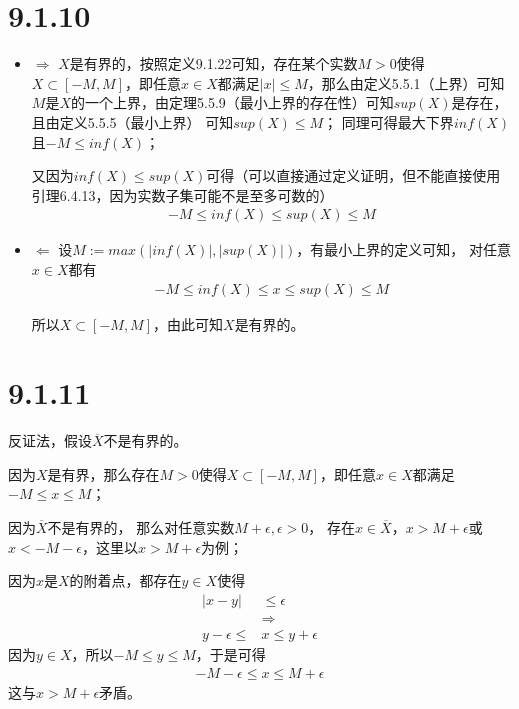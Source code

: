 \documentclass{article}
\begin{document}
\section*{9.1.10}

\begin{itemize}
      \item $\Rightarrow$ $X$是有界的，按照定义9.1.22可知，存在某个实数$M > 0$使得
            $X \subset [-M, M]$，即任意$x \in X$都满足$|x| \leq M$，那么由定义5.5.1（上界）可知
            $M$是$X$的一个上界，由定理5.5.9（最小上界的存在性）可知$sup(X)$是存在，且由定义5.5.5（最小上界）
            可知$sup(X) \leq M$；
            同理可得最大下界$inf(X)$且$-M \leq inf(X)$；

            又因为$inf(X) \leq sup(X)$可得（可以直接通过定义证明，但不能直接使用引理6.4.13，因为实数子集可能不是至多可数的）
            \begin{align*}
                  -M \leq inf(X) \leq sup(X) \leq M
            \end{align*}

      \item $\Leftarrow$ 设$M := max(|inf(X)|, |sup(X)|)$，有最小上界的定义可知，
            对任意$x \in X$都有
            \begin{align*}
                  -M \leq  inf(X) \leq x \leq sup(X) \leq M
            \end{align*}

            所以$X \subset [-M, M]$，由此可知$X$是有界的。
\end{itemize}

\section*{9.1.11}

反证法，假设$\overline{X}$不是有界的。

因为$X$是有界，那么存在$M > 0$使得$X \subset [-M, M]$，即任意$x \in X$都满足$-M \leq x \leq M$；

因为$\overline{X}$不是有界的，
那么对任意实数$M + \epsilon, \epsilon > 0$，
存在$x \in \overline{X}$，$x > M + \epsilon$或$x < -M - \epsilon$，这里以$x > M + \epsilon$为例；

因为$x$是$X$的附着点，都存在$y \in X$使得
\begin{align*}
      |x - y|           & \leq \epsilon       \\
                        & \Rightarrow         \\
      y - \epsilon \leq & x \leq y + \epsilon
\end{align*}
因为$y \in X$，所以$-M \leq y \leq M$，于是可得
\begin{align*}
      -M - \epsilon \leq x \leq M + \epsilon
\end{align*}
这与$x > M + \epsilon$矛盾。
\end{document}
